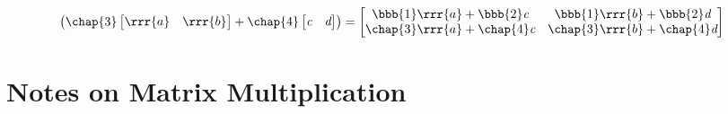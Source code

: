 \begin{itemize}
\begin{itemize}
\[\begin{pmatrix}
    \chap{3} \begin{bmatrix} \rrr{a} & \rrr{b} \end{bmatrix} + 
    \chap{4} \begin{bmatrix} \emph{c} & \emph{d} \end{bmatrix}
    \end{pmatrix}
    =
    \begin{bmatrix}
      \bbb{1}\rrr{a} + \bbb{2}\emph{c} & \bbb{1}\rrr{b}+\bbb{2}\emph{d} \\ \chap{3}\rrr{a}+\chap{4}\emph{c} & \chap{3}\rrr{b}+\chap{4}\emph{d} 
    \end{bmatrix}
  \]%
  \end{itemize}
\end{itemize}

\section{Notes on Matrix Multiplication}\label{Notes on Matrix Multiplication}
